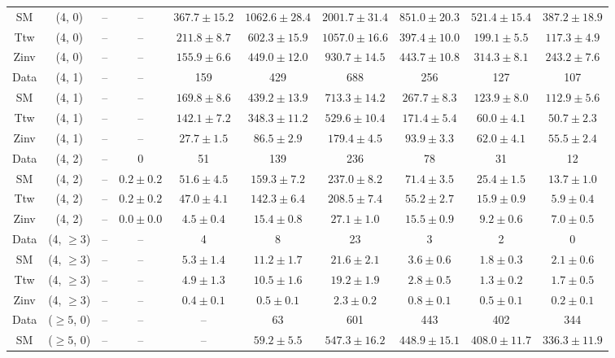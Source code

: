 \begin{table}[h!]
{\begin{tabular}{cccccccccc}
	SM & (4, 0) & -- & -- & $367.7\pm 15.2$ & $1062.6\pm 28.4$ & $2001.7\pm 31.4$ & $851.0\pm 20.3$ & $521.4\pm 15.4$ & $387.2\pm 18.9$ \\[0.5ex] 
	Ttw & (4, 0) & -- & -- & $211.8\pm 8.7$ & $602.3\pm 15.9$ & $1057.0\pm 16.6$ & $397.4\pm 10.0$ & $199.1\pm 5.5$ & $117.3\pm 4.9$ \\[0.5ex] 
	Zinv & (4, 0) & -- & -- & $155.9\pm 6.6$ & $449.0\pm 12.0$ & $930.7\pm 14.5$ & $443.7\pm 10.8$ & $314.3\pm 8.1$ & $243.2\pm 7.6$ \\[0.5ex] 
	Data & (4, 1) & -- & -- & 159 & 429 & 688 & 256 & 127 & 107 \\[0.5ex] 
	SM & (4, 1) & -- & -- & $169.8\pm 8.6$ & $439.2\pm 13.9$ & $713.3\pm 14.2$ & $267.7\pm 8.3$ & $123.9\pm 8.0$ & $112.9\pm 5.6$ \\[0.5ex] 
	Ttw & (4, 1) & -- & -- & $142.1\pm 7.2$ & $348.3\pm 11.2$ & $529.6\pm 10.4$ & $171.4\pm 5.4$ & $60.0\pm 4.1$ & $50.7\pm 2.3$ \\[0.5ex] 
	Zinv & (4, 1) & -- & -- & $27.7\pm 1.5$ & $86.5\pm 2.9$ & $179.4\pm 4.5$ & $93.9\pm 3.3$ & $62.0\pm 4.1$ & $55.5\pm 2.4$ \\[0.5ex] 
	Data & (4, 2) & -- & 0 & 51 & 139 & 236 & 78 & 31 & 12 \\[0.5ex] 
	SM & (4, 2) & -- & $0.2\pm 0.2$ & $51.6\pm 4.5$ & $159.3\pm 7.2$ & $237.0\pm 8.2$ & $71.4\pm 3.5$ & $25.4\pm 1.5$ & $13.7\pm 1.0$ \\[0.5ex] 
	Ttw & (4, 2) & -- & $0.2\pm 0.2$ & $47.0\pm 4.1$ & $142.3\pm 6.4$ & $208.5\pm 7.4$ & $55.2\pm 2.7$ & $15.9\pm 0.9$ & $5.9\pm 0.4$ \\[0.5ex] 
	Zinv & (4, 2) & -- & $0.0\pm 0.0$ & $4.5\pm 0.4$ & $15.4\pm 0.8$ & $27.1\pm 1.0$ & $15.5\pm 0.9$ & $9.2\pm 0.6$ & $7.0\pm 0.5$ \\[0.5ex] 
	Data & (4, $\ge3$) & -- & -- & 4 & 8 & 23 & 3 & 2 & 0 \\[0.5ex] 
	SM & (4, $\ge3$) & -- & -- & $5.3\pm 1.4$ & $11.2\pm 1.7$ & $21.6\pm 2.1$ & $3.6\pm 0.6$ & $1.8\pm 0.3$ & $2.1\pm 0.6$ \\[0.5ex] 
	Ttw & (4, $\ge3$) & -- & -- & $4.9\pm 1.3$ & $10.5\pm 1.6$ & $19.2\pm 1.9$ & $2.8\pm 0.5$ & $1.3\pm 0.2$ & $1.7\pm 0.5$ \\[0.5ex] 
	Zinv & (4, $\ge3$) & -- & -- & $0.4\pm 0.1$ & $0.5\pm 0.1$ & $2.3\pm 0.2$ & $0.8\pm 0.1$ & $0.5\pm 0.1$ & $0.2\pm 0.1$ \\[0.5ex] 
	Data & ($\ge5$, 0) & -- & -- & -- & 63 & 601 & 443 & 402 & 344 \\[0.5ex] 
	SM & ($\ge5$, 0) & -- & -- & -- & $59.2\pm 5.5$ & $547.3\pm 16.2$ & $448.9\pm 15.1$ & $408.0\pm 11.7$ & $336.3\pm 11.9$ \\[0.5ex] 

\end{tabular}}
\end{table}
